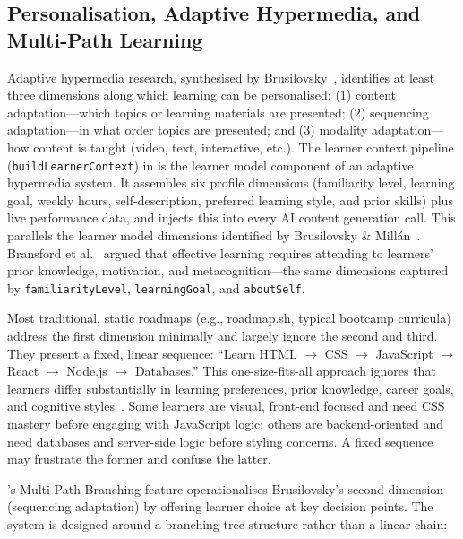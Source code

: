 \subsection{Personalisation, Adaptive Hypermedia, and Multi-Path Learning}
\label{sec:personalisation}

Adaptive hypermedia research, synthesised by Brusilovsky~\cite{brusilovsky1996, brusilovsky2001}, identifies at least three dimensions along which learning can be personalised: (1) content adaptation---which topics or learning materials are presented; (2) sequencing adaptation---in what order topics are presented; and (3) modality adaptation---how content is taught (video, text, interactive, etc.). The learner context pipeline (\texttt{buildLearnerContext}) in \projectname{} is the learner model component of an adaptive hypermedia system. It assembles six profile dimensions (familiarity level, learning goal, weekly hours, self-description, preferred learning style, and prior skills) plus live performance data, and injects this into every AI content generation call. This parallels the learner model dimensions identified by Brusilovsky \& Millán~\cite{brusilovsky2007}. Bransford et al.~\cite{bransford2000} argued that effective learning requires attending to learners' prior knowledge, motivation, and metacognition---the same dimensions captured by \texttt{familiarityLevel}, \texttt{learningGoal}, and \texttt{aboutSelf}.

Most traditional, static roadmaps (e.g., roadmap.sh, typical bootcamp curricula) address the first dimension minimally and largely ignore the second and third. They present a fixed, linear sequence: \enquote{Learn HTML \(\rightarrow\) CSS \(\rightarrow\) JavaScript \(\rightarrow\) React \(\rightarrow\) Node.js \(\rightarrow\) Databases.} This one-size-fits-all approach ignores that learners differ substantially in learning preferences, prior knowledge, career goals, and cognitive styles~\cite{pashler2008}. Some learners are visual, front-end focused and need CSS mastery before engaging with JavaScript logic; others are backend-oriented and need databases and server-side logic before styling concerns. A fixed sequence may frustrate the former and confuse the latter.

\projectname's Multi-Path Branching feature operationalises Brusilovsky's second dimension (sequencing adaptation) by offering learner choice at key decision points. The system is designed around a branching tree structure rather than a linear chain:

